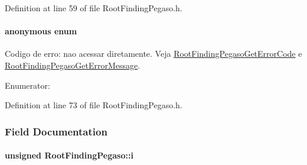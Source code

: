 Definition at line 59 of file RootFindingPegaso.h.\hypertarget{structRootFindingPegaso_7696162d3b2a9cbc51b25b197fd15c97}{
\paragraph["@9]{\setlength{\rightskip}{0pt plus 5cm}anonymous enum}\hfill}
\label{structRootFindingPegaso_7696162d3b2a9cbc51b25b197fd15c97}


Codigo de erro: nao acessar diretamente. Veja \hyperlink{group____pegaso_g6b27d39dab4f225185c07eb6fbb22ff9}{RootFindingPegasoGetErrorCode} e \hyperlink{group____pegaso_g4d0abd516b71e0462de1b22ce896b87a}{RootFindingPegasoGetErrorMessage}. 

\begin{Desc}
\item[Enumerator: ]\par
\begin{description}
\item[{\em 
\hypertarget{structRootFindingPegaso_7696162d3b2a9cbc51b25b197fd15c97533ab94376981d2770a69664285fe1bb}{
PEGASO\_\-NO\_\-ERROR}
\label{structRootFindingPegaso_7696162d3b2a9cbc51b25b197fd15c97533ab94376981d2770a69664285fe1bb}
}]\item[{\em 
\hypertarget{structRootFindingPegaso_7696162d3b2a9cbc51b25b197fd15c9745bf7192792e1bb0b9b99f6e25efe900}{
PEGASO\_\-X\_\-ISINF\_\-OR\_\-ISNAN\_\-ERROR}
\label{structRootFindingPegaso_7696162d3b2a9cbc51b25b197fd15c9745bf7192792e1bb0b9b99f6e25efe900}
}]\end{description}
\end{Desc}



Definition at line 73 of file RootFindingPegaso.h.

\subsubsection{Field Documentation}
\hypertarget{structRootFindingPegaso_5eb3cedde0b6d796aa01d2a85f318901}{
\paragraph[i]{\setlength{\rightskip}{0pt plus 5cm}unsigned {\bf RootFindingPegaso::i}}\hfill}
\label{structRootFindingPegaso_5eb3cedde0b6d796aa01d2a85f318901}




